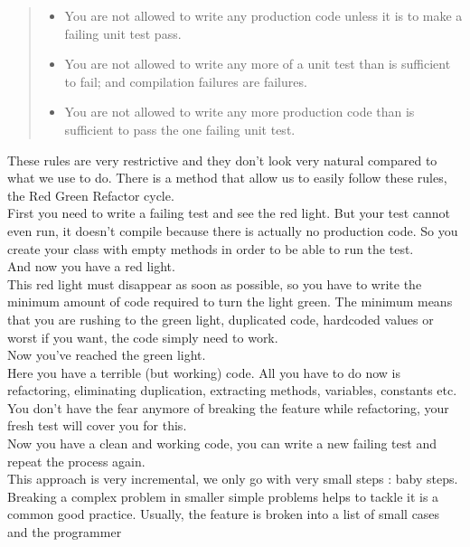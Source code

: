 \begin{quote}
\begin{itemize}
\item You are not allowed to write any production code unless it is to make
a failing unit test pass.
\item You are not allowed to write any more of a unit test than is sufficient
to fail;
and compilation failures are failures.
\item You are not allowed to write any more production code than is sufficient
to pass the one failing unit test.
\end{itemize}
\end{quote}

These rules are very restrictive and they don't look very natural compared to
what we use to do.
There is a method that allow us to easily follow these rules, the Red Green
Refactor cycle. \\
\newline
First you need to write a failing test and see the red light.
But your test cannot even run, it doesn't compile because there is actually
no production code.
So you create your class with empty methods in order to be able to run the
test. \\
And now you have a red light. \\
\newline
This red light must disappear as soon as possible, so you have to write
the minimum amount of code required to turn the light green.
The minimum means that you are rushing to the green light, duplicated code,
hardcoded values or worst if you want, the code simply need to work. \\
Now you've reached the green light. \\
\newline
Here you have a terrible (but working) code.
All you have to do now is refactoring, eliminating duplication,
extracting methods, variables, constants etc.
You don't have the fear anymore of breaking the feature while refactoring,
your fresh test will cover you for this. \\
Now you have a clean and working code, you can write a new failing test and
repeat the process again. \\
\newline
This approach is very incremental, we only go with very small steps :
baby steps.
Breaking a complex problem in smaller simple problems helps to tackle it
is a common good practice.
Usually, the feature is broken into a list of small cases and the programmer
